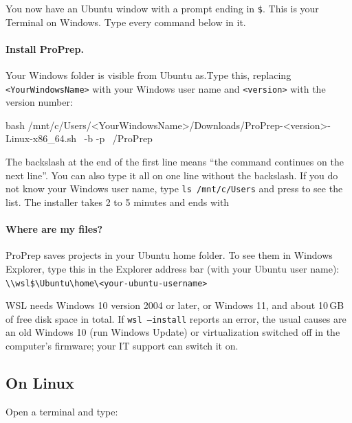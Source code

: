 You now have an Ubuntu window with a prompt ending in \texttt{\$}. This is
your Terminal on Windows. Type every command below in it.

\paragraph{Install ProPrep.} Your Windows  folder is visible
from Ubuntu as\newline {}.\newline Type this,
replacing \texttt{<YourWindowsName>} with your Windows user name and
\texttt{<version>} with the version number:

\begin{terminal}
bash /mnt/c/Users/<YourWindowsName>/Downloads/ProPrep-<version>-Linux-x86_64.sh \
  -b -p ~/ProPrep
\end{terminal}

The backslash at the end of the first line means ``the command continues on
the next line''. You can also type it all on one line without the backslash.
If you do not know your Windows user name, type \texttt{ls /mnt/c/Users} and
press \key{Enter} to see the list. The installer takes 2 to 5 minutes and ends
with \prompt{ProPrep is installed.}

\paragraph{Where are my files?} ProPrep saves projects in your Ubuntu home
folder. To see them in Windows Explorer, type this in the Explorer address bar
(with your Ubuntu user name): \verb|\\wsl$\Ubuntu\home\<your-ubuntu-username>|

\begin{watchout}
WSL needs Windows 10 version 2004 or later, or Windows 11, and about 10\,GB of
free disk space in total. If \texttt{wsl --install} reports an error, the usual
causes are an old Windows 10 (run Windows Update) or virtualization switched
off in the computer's firmware; your IT support can switch it on.
\end{watchout}

\subsection{On Linux}
\label{sec:installation-linux}

Open a terminal and type:

